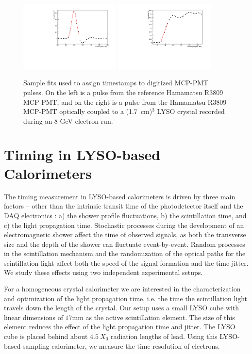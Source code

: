 \documentclass[12pt]{article}
\begin{document}
\begin{figure}[h] \centering
\includegraphics[width=0.45\textwidth]{figs/Reference_Pulse_GausFit_057_ev322.pdf} 
\includegraphics[width=0.45\textwidth]{figs/LYSOCube_Pulse_RisingEdgeFit_057_ev313.pdf} 
\caption{\small Sample fits used to assign timestamps to digitized MCP-PMT pulses. 
On the left is a pulse from the reference Hamamatsu R3809 MCP-PMT, and
on the right is a pulse from the Hamamatsu R3809 MCP-PMT
optically coupled to a (1.7~cm)$^{3}$  LYSO crystal
recorded during an 8 GeV electron run.}
\label{fig:PulseFits}
\end{figure}


\section{Timing in LYSO-based Calorimeters}
The timing measurement in 
LYSO-based calorimeters is driven by three main factors  -- other  than the intrinsic transit 
time of the photodetector itself and the DAQ electronics : a) the shower profile fluctuations,  
b) the scintillation time, and c) the light propagation time. Stochastic processes during the
development of an electromagnetic shower affect the time of observed signals, as
both the transverse size and the depth of the shower can fluctuate event-by-event. 
Random processes in the scintillation mechanism and the randomization of
the optical paths for the scintillation light affect both the speed of the
signal formation and the time jitter. We study these effects using two
independent experimental setups. 

For a  homogeneous crystal calorimeter we are interested in the characterization and 
optimization of the light propagation time, i.e. the time the scintillation light travels
down the length of the crystal. Our setup uses a small LYSO cube with linear dimensions 
of $17\mathrm{mm}$ as the active scintillation element. The size of this element reduces 
the effect of the light propagation time and jitter. The LYSO cube is placed behind about 
$4.5~X_0$ radiation lengths of lead. Using this LYSO-based sampling calorimeter, we
measure the time resolution of electrons.
\end{document}
